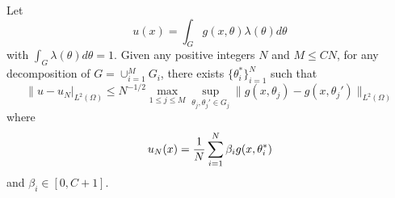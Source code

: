 \begin{lemma}\label{lem:stratifiedapprox}
	Let 
	\begin{equation}
	\label{uv}
	u(x)=\int_{G}g(x,\theta)\lambda(\theta)d\theta  
	\end{equation}
	with $\int_G \lambda(\theta) d\theta=1$. Given any positive integers $N$ and $M\le CN$, for  any decomposition of $G=\cup_{i=1}^M G_i$, there exists $\{\theta_i^\ast\}_{i=1}^N$ such that
	\begin{equation} 
	\|u-u_N|_{L^2(\Omega)} \leq N^{-1/2}\max_{1\le j\le M}\sup_{\theta_{j},\theta_{j}'\in G_j} \| g(x,\theta_j) - g(x,\theta_j')\|_{L^2(\Omega)} 
	\end{equation}
	where 
	$$
	u_N(x)= {1\over N}\sum_{i=1}^N\beta_i g(x,\theta_i^\ast)
	$$ 
	and $\beta_i\in [0,C+1]$.
	\end{lemma}

